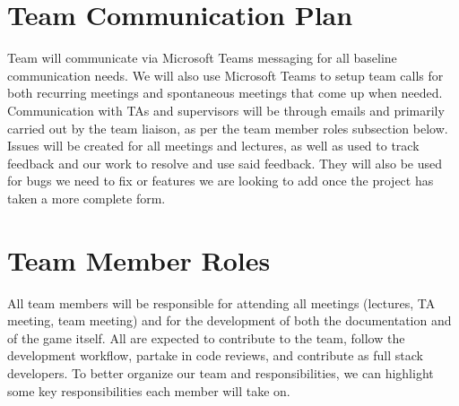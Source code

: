 \documentclass{article}
\begin{document}
\section{Team Communication Plan}

Team will communicate via Microsoft Teams messaging for all baseline communication needs. We will also use Microsoft Teams to setup team calls for both recurring meetings and spontaneous meetings that come up when needed.\\
Communication with TAs and supervisors will be through emails and primarily carried out by the team liaison, as per the team member roles subsection below.\\
Issues will be created for all meetings and lectures, as well as used to track feedback and our work to resolve and use said feedback. They will also be used for bugs we need to fix or features we are looking to add once the project has taken a more complete form.

\section{Team Member Roles}

All team members will be responsible for attending all meetings (lectures, TA meeting, team meeting) and for the development of both the documentation and of the game itself. All are expected to contribute to the team, follow the development workflow, partake in code reviews, and contribute as full stack developers. To better organize our team and responsibilities, we can highlight some key responsibilities each member will take on.
\end{document}

